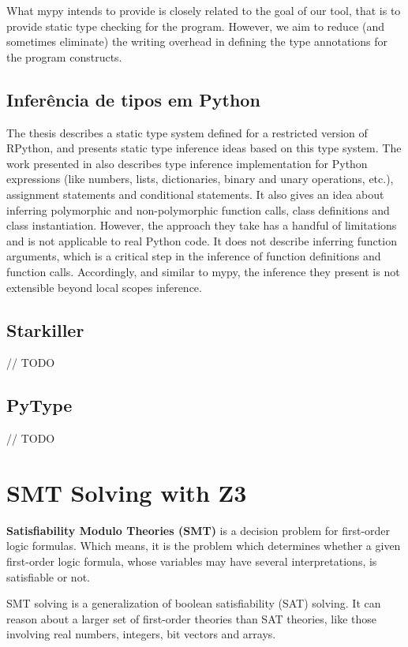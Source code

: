 What mypy intends to provide is closely related to the goal of our tool, that is to provide static type checking for the program. However, we aim to reduce (and sometimes eliminate) the writing overhead in defining the type annotations for the program constructs.


\subsection{Inferência de tipos em Python \cite{porto}}
The thesis \cite{porto} describes a static type system defined for a restricted version of RPython, and presents static type inference ideas based on this type system. The work presented in \cite{porto} also describes type inference implementation for Python expressions (like numbers, lists, dictionaries, binary and
unary operations, etc.), assignment statements and conditional statements. It also gives an idea about inferring polymorphic and non-polymorphic function calls, class definitions and class instantiation. However, the approach they take has a handful of limitations and is not applicable to real Python code. It does not describe inferring function arguments, which is a critical step in the inference of function definitions and function calls. Accordingly, and similar to mypy, the inference they present is not extensible beyond local scopes inference.

\subsection{Starkiller}
// TODO

\subsection{PyType}
// TODO


\section{SMT Solving with Z3 \cite{z3}}
\textbf{Satisfiability Modulo Theories (SMT)} is a decision problem for first-order logic formulas. Which means, it is the problem which determines whether a given first-order logic formula, whose variables may have several interpretations, is satisfiable or not.

SMT solving is a generalization of boolean satisfiability (SAT) solving. It can reason about a larger set of first-order theories than SAT theories, like those involving real numbers, integers, bit vectors and arrays.\\

